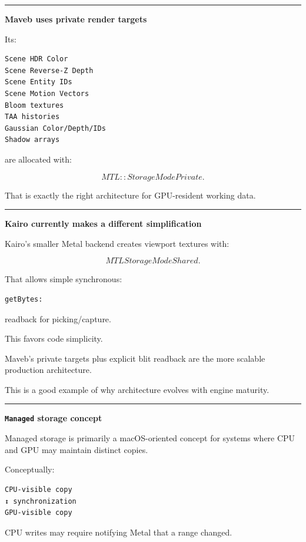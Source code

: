 \begin{center}\rule{0.5\linewidth}{0.5pt}\end{center}

\textbf{Maveb uses private render targets}

Its:

\begin{verbatim}
Scene HDR Color
Scene Reverse-Z Depth
Scene Entity IDs
Scene Motion Vectors
Bloom textures
TAA histories
Gaussian Color/Depth/IDs
Shadow arrays
\end{verbatim}

are allocated with:

\[
MTL::StorageModePrivate.
\]

That is exactly the right architecture for GPU-resident working data.

\begin{center}\rule{0.5\linewidth}{0.5pt}\end{center}

\textbf{Kairo currently makes a different simplification}

Kairo's smaller Metal backend creates viewport textures with:

\[
MTLStorageModeShared.
\]

That allows simple synchronous:

\begin{verbatim}
getBytes:
\end{verbatim}

readback for picking/capture.

This favors code simplicity.

Maveb's private targets plus explicit blit readback are the more scalable production architecture.

This is a good example of why architecture evolves with engine maturity.

\begin{center}\rule{0.5\linewidth}{0.5pt}\end{center}

\textbf{\texttt{Managed} storage concept}

Managed storage is primarily a macOS-oriented concept for systems where CPU and GPU may maintain distinct copies.

Conceptually:

\begin{verbatim}
CPU-visible copy
↕ synchronization
GPU-visible copy
\end{verbatim}

CPU writes may require notifying Metal that a range changed.

